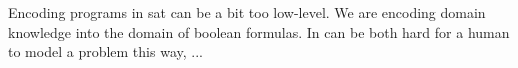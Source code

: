 


Encoding programs in \gls{sat} can be a bit too low-level. We are encoding
domain knowledge into the domain of boolean formulas. In can be both hard for a
human to model a problem this way, ...



